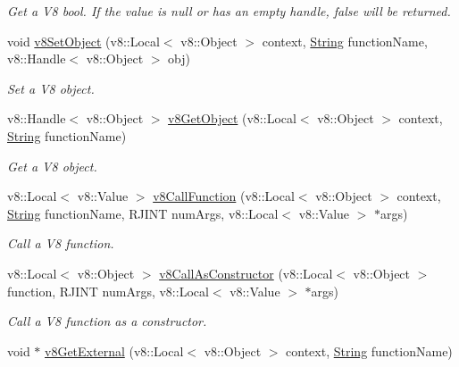 \begin{DoxyCompactItemize}
\begin{DoxyCompactList}\small\item\em Get a V8 bool. If the value is null or has an empty handle, false will be returned. \end{DoxyCompactList}\item 
void \mbox{\hyperlink{class_rad_j_a_v_1_1_v8_javascript_engine_af8bcd13608787e3d2eef9287c2b27b40}{v8\+Set\+Object}} (v8\+::\+Local$<$ v8\+::\+Object $>$ context, \mbox{\hyperlink{class_rad_j_a_v_1_1_string}{String}} function\+Name, v8\+::\+Handle$<$ v8\+::\+Object $>$ obj)
\begin{DoxyCompactList}\small\item\em Set a V8 object. \end{DoxyCompactList}\item 
v8\+::\+Handle$<$ v8\+::\+Object $>$ \mbox{\hyperlink{class_rad_j_a_v_1_1_v8_javascript_engine_a2dd95ba66026d628daaf579cca1b0504}{v8\+Get\+Object}} (v8\+::\+Local$<$ v8\+::\+Object $>$ context, \mbox{\hyperlink{class_rad_j_a_v_1_1_string}{String}} function\+Name)
\begin{DoxyCompactList}\small\item\em Get a V8 object. \end{DoxyCompactList}\item 
v8\+::\+Local$<$ v8\+::\+Value $>$ \mbox{\hyperlink{class_rad_j_a_v_1_1_v8_javascript_engine_ade8a5121713c49ba07afcfd38d8c7960}{v8\+Call\+Function}} (v8\+::\+Local$<$ v8\+::\+Object $>$ context, \mbox{\hyperlink{class_rad_j_a_v_1_1_string}{String}} function\+Name, R\+J\+I\+NT num\+Args, v8\+::\+Local$<$ v8\+::\+Value $>$ $\ast$args)
\begin{DoxyCompactList}\small\item\em Call a V8 function. \end{DoxyCompactList}\item 
v8\+::\+Local$<$ v8\+::\+Object $>$ \mbox{\hyperlink{class_rad_j_a_v_1_1_v8_javascript_engine_a69ece27850f67c44a45292377f953823}{v8\+Call\+As\+Constructor}} (v8\+::\+Local$<$ v8\+::\+Object $>$ function, R\+J\+I\+NT num\+Args, v8\+::\+Local$<$ v8\+::\+Value $>$ $\ast$args)
\begin{DoxyCompactList}\small\item\em Call a V8 function as a constructor. \end{DoxyCompactList}\item 
void $\ast$ \mbox{\hyperlink{class_rad_j_a_v_1_1_v8_javascript_engine_a85e3f8d1a8da39f1197fabb6a1f1825d}{v8\+Get\+External}} (v8\+::\+Local$<$ v8\+::\+Object $>$ context, \mbox{\hyperlink{class_rad_j_a_v_1_1_string}{String}} function\+Name)

\end{DoxyCompactItemize}
